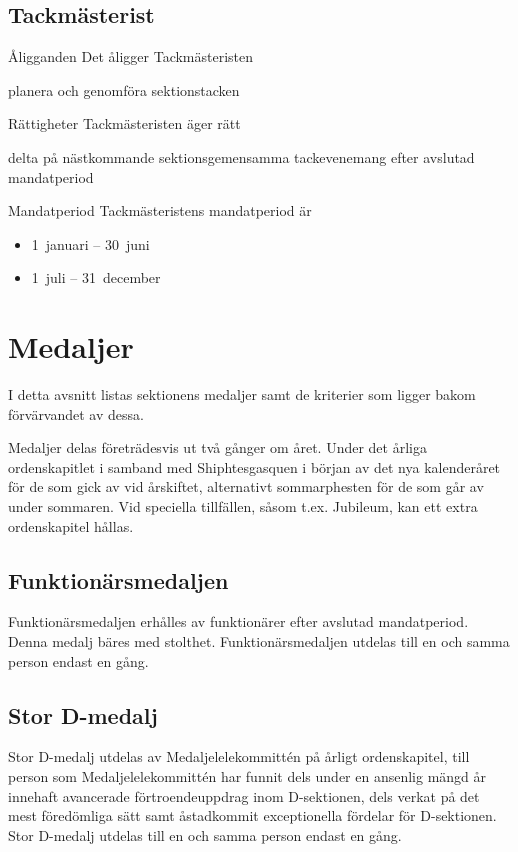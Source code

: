 \documentclass[pdfbookmarks,a4paper,11pt]{article}
\newcommand{\funktionar}[1]{%
  \subsection*{#1}\par
  \addcontentsline{toc}{subsection}{#1}}
\newlength{\itemcollength}
\newenvironment{reglemlista}{%
  \begin{list}{}{%
      \setlength{\labelwidth}{\itemcollength}%
      \setlength{\leftmargin}{\labelwidth + \labelsep}%
      \renewcommand{\makelabel}[1]{%
        \raisebox{0pt}[1ex][0pt]{%
          \makebox[\labelwidth][l]{%
            \parbox[t]{\itemcollength}{%
              \raggedright\hspace{0pt}##1}}}\hfill}%
      }}{%
  \end{list}}
\begin{document}
\funktionar{Tackmästerist}
\begin{reglemlista}
\item[Åligganden]
  Det åligger Tackmästeristen
  \begin{attlista}
    \item planera och genomföra sektionstacken
    \end{attlista}
  \item[Rättigheter]
    Tackmästeristen äger rätt
    \begin{attlista}
      \item delta på nästkommande sektionsgemensamma tackevenemang efter avslutad mandatperiod
      \end{attlista}
    \item[Mandatperiod]
      Tackmästeristens mandatperiod är
      \begin{itemize}
      \item 1~januari -- 30~juni
      \item 1~juli -- 31~december
      \end{itemize}
\end{reglemlista}


\section{Medaljer}

I detta avsnitt listas sektionens medaljer samt de kriterier som ligger bakom förvärvandet av dessa.

Medaljer delas företrädesvis ut två gånger om året. Under det årliga ordenskapitlet i samband med Shiphtesgasquen i början av det nya kalenderåret för de som gick av vid årskiftet, alternativt sommarphesten för de som går av under sommaren. Vid speciella tillfällen, såsom t.ex. Jubileum, kan ett extra ordenskapitel hållas.

\subsection{Funktionärsmedaljen}
Funktionärsmedaljen erhålles av funktionärer efter avslutad mandatperiod. Denna medalj bäres med stolthet. Funktionärsmedaljen utdelas till en och samma person endast en gång.

\subsection{Stor D-medalj}
Stor D-medalj utdelas av Medaljelelekommittén på årligt ordenskapitel, till person som Medaljelelekommittén har funnit dels under en ansenlig mängd år innehaft avancerade förtroendeuppdrag inom D-sektionen, dels verkat på det mest föredömliga sätt samt åstadkommit exceptionella fördelar för D-sektionen. Stor D-medalj utdelas till en och samma person endast en gång.
\end{document}
